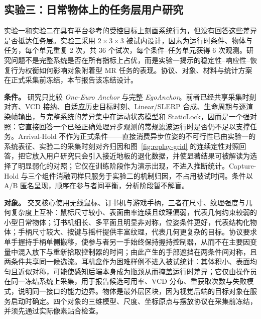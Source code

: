 \documentclass[review]{vgtc}
\begin{document}
\subsection{实验三：日常物体上的任务层用户研究}

实验一和实验二在具有平台参考的受控目标上刻画系统行为，但没有回答这些差异是否抵达任务层。实验三采用 $2 \times 3 \times 3$ 被试内设计，因素为运行时条件、物体与任务，每个单元重复 2 次，共 36 个试次，每个条件--任务单元获得 6 次观测。研究问题不是完整系统是否在所有指标上占优，而是实验一揭示的稳定性--响应性--恢复行为权衡如何影响对象附着型 MR 任务的表现。协议、对象、材料与统计方案在正式采集前冻结，本节报告该冻结设计。

\textbf{条件。} 研究只比较 \emph{One-Euro Anchor} 与完整 \emph{EgoAnchor}。前者已经共享采集时刻对齐、VCD 接纳、自适应历史目标时刻、Linear/SLERP 合成、生命周期与逐渲染帧输出，与完整系统的差异集中在运动状态模型和 StaticLock，因而是一个强对照：它直接回答一个已经正确处理异步观测的常规滤波运行时是否仍不足以支撑任务。Arrival-Hold 不作为正式条件——直接消费异步位姿的不可行性已由实验一的系统表征、实验二的采集时刻对齐归因和图~\ref{fig:replay-grid} 的连续定性对照回答，把它放入用户研究只会引入接近地板的退化数据，并使显著结果可被解读为选择了明显弱化的对照；它仅在训练阶段作为演示出现，不进入推断统计。Capture-Hold 与三个组件消融同样只服务于实验二的机制归因，不占用被试时间。条件以 A/B 匿名呈现，顺序在参与者间平衡，分析阶段暂不解盲。

\textbf{对象。} 交叉核心使用无线鼠标、订书机与游戏手柄，三者在尺寸、纹理强度与几何复杂度上互补：鼠标尺寸较小、表面曲率连续且纹理偏弱，代表几何约束较弱的小型日常物体；订书机细长、多平面且明显非对称，位姿条件更好，代表结构化物体；手柄尺寸较大、按键与摇杆提供丰富纹理，代表几何更复杂的目标。协议要求单手握持手柄单侧搬移，使参与者另一手始终保持握持控制器，从而不在主要因变量中混入放下与重新拾取控制器的时间；由此产生的手部遮挡在两条件间对称，且两条件共享同一候选流。耳机盒作为困难样例不进入被试统计：其体积小、表面均匀且近似对称，可能使感知后端本身成为瓶颈从而掩盖运行时差异；它仅由操作员在同一冻结系统上采集，用于报告候选可用率、VCD 分布、重获取次数与失败模式，说明同一接口的能力边界。物体是最外层区块，因为视觉后端的目标对象在服务启动时确定。四个对象的三维模型、尺度、坐标原点与摆放协议在采集前冻结，并须先通过实际像素贴合检查。
\end{document}
